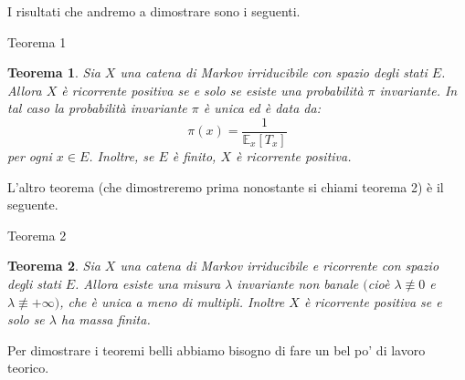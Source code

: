 \documentclass[11pt]{book}
\theoremstyle{Definizione}
\theoremstyle{TeoremaProposizioneLemmaCorollario}
\newtheorem{myteo}{Teorema}[section]
\theoremstyle{OsservazioneNota}
\newcommand{\E}{\mathbb{E}}
\begin{document}
\noindent
I risultati che andremo a dimostrare sono i seguenti.
\begin{boxteo}{Teorema 1}
\begin{myteo}\label{teo:Teorema1}
Sia $X$ una catena di Markov irriducibile con spazio degli stati $E$. Allora $X$ è ricorrente positiva se e solo se esiste una probabilità $\pi$ invariante. In tal caso la probabilità invariante $\pi$ è unica ed è data da:
$$
\pi(x) = \frac{1}{\E_x[T_x]}
$$
per ogni $x\in E$. Inoltre, se $E$ è finito, $X$ è ricorrente positiva.
\end{myteo}
\end{boxteo}
\noindent
L'altro teorema (che dimostreremo prima nonostante si chiami teorema 2) è il seguente.
\begin{boxteo}{Teorema 2}
\begin{myteo}\label{teo:Teorema2}
Sia $X$ una catena di Markov irriducibile e ricorrente con spazio degli stati $E$. Allora esiste una misura $\lambda$ invariante non banale $($cioè $\lambda \not \equiv 0$ e $\lambda \not \equiv +\infty)$, che è unica a meno di multipli. Inoltre $X$ è ricorrente positiva se e solo se $\lambda$ ha massa finita.
\end{myteo}
\end{boxteo}
\noindent
Per dimostrare i teoremi belli abbiamo bisogno di fare un bel po' di lavoro teorico.
\end{document}
